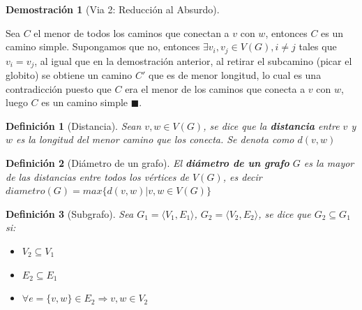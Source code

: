 \documentclass[a4paper,1pt]{report}
\newtheorem*{dem}{Demostración}
\newtheorem*{dfn}{Definición}
\begin{document}
\begin{dem}[Via 2: Reducci\'on al Absurdo]\end{dem}
Sea $C$ el menor de todos los caminos que conectan a $v$ con $w$, entonces $C$ es un camino simple. Supongamos que no, entonces $\exists v_i, v_j \in V(G), i\neq j$ tales que $v_i = v_j$, al igual que en la demostraci\'on anterior, al retirar el subcamino (picar el globito) se obtiene un camino $C'$ que es de menor longitud, lo cual es una contradicci\'on puesto que $C$ era el menor de los caminos que conecta a $v$ con $w$, luego $C$ es un camino simple $\blacksquare$.

\begin{dfn}[Distancia]
    Sean $v, w \in V(G)$, se dice que la \textbf{distancia} entre $v$ y $w$ es la longitud del menor camino que los conecta. Se denota como $d(v,w)$
\end{dfn}

\begin{dfn}[Di\'ametro de un grafo]
    El \textbf{di\'ametro de un grafo} $G$ es la mayor de las distancias entre todos los v\'ertices de $V(G)$, es decir $diametro(G) = max\{ d(v,w) | v,w \in V(G)\}$
\end{dfn}

\begin{dfn}[Subgrafo]
    Sea $G_1 = \langle V_1, E_1 \rangle$, $G_2 = \langle V_2, E_2 \rangle$, se dice que $G_2 \subseteq G_1$ si: 
    \begin{itemize}
        \item $V_2 \subseteq V_1$
        \item $E_2 \subseteq E_1$
        \item $\forall e = \{v,w\} \in  E_2 \Rightarrow v,w \in V_2$
    \end{itemize}
\end{dfn}
\end{document}
